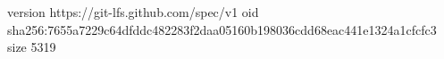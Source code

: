 version https://git-lfs.github.com/spec/v1
oid sha256:7655a7229c64dfddc482283f2daa05160b198036cdd68eac441e1324a1cfcfc3
size 5319
